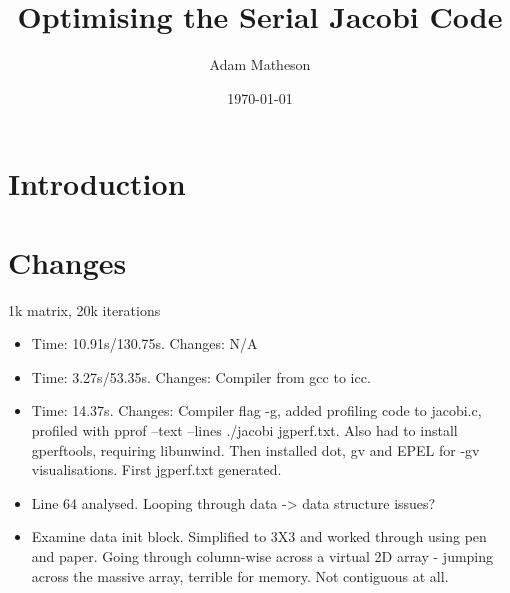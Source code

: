 \documentclass{article}
\begin{document}
\title{Optimising the Serial Jacobi Code}
\author{Adam Matheson}
\date{\today}

\section{Introduction}

\section{Changes}
1k matrix, 20k iterations
\begin{itemize}
\item Time: 10.91s/130.75s. Changes: N/A
\item Time: 3.27s/53.35s. Changes: Compiler from gcc to icc.
\item Time: 14.37s. Changes: Compiler flag -g, added profiling code to jacobi.c, profiled with pprof --text --lines ./jacobi jgperf.txt. Also had to install gperftools, requiring libunwind. Then installed dot, gv and EPEL for -gv visualisations. First jgperf.txt generated.
\item Line 64 analysed. Looping through data -> data structure issues?
\item Examine data init block. Simplified to 3X3 and worked through using pen and paper. Going through column-wise across a virtual 2D array - jumping across the massive array, terrible for memory. Not contiguous at all.

\end{itemize}
\end{document}

